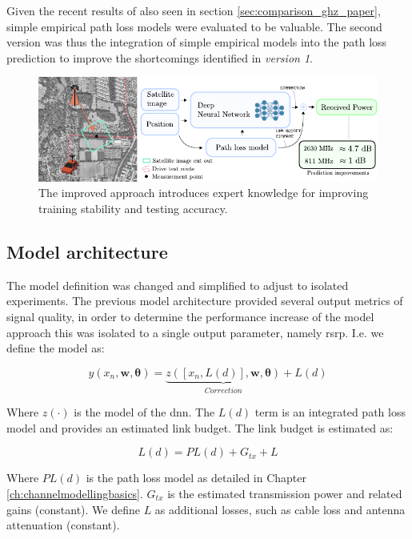 Given the recent results of \cite{Thrane2019ComparisonGHz} also seen in section \ref{sec:comparison_ghz_paper}, simple empirical path loss models were evaluated to be valuable. The second version was thus the integration of simple empirical models into the path loss prediction to improve the shortcomings identified in \emph{version 1}. 

\begin{figure}
    \centering
    \includegraphics{chapters/part_pathloss/model_aided_paper/version2_approach_figure.pdf}
    \caption{The improved approach introduces expert knowledge for improving training stability and testing accuracy.}
    \label{fig:my_label}
\end{figure}

\subsection{Model architecture}
The model definition was changed and simplified to adjust to isolated experiments. The previous model architecture provided several output metrics of signal quality, in order to determine the performance increase of the model approach this was isolated to a single output parameter, namely \gls{rsrp}. I.e. we define the model as:

\begin{equation}\label{eq:model}
    y(x_n, \mathbf{w}, \bm{\theta}) = \underbrace{z([x_n, L(d)], \mathbf{w}, \bm{\theta})}_{Correction} + L(d)
\end{equation}

Where $z(\cdot)$ is the model of the \gls{dnn}. The $L(d)$ term is an integrated path loss model and provides an estimated link budget. The link budget is estimated as:

\begin{equation}\label{eq:path_loss_model_linkbudget}
L(d) = PL(d) + G_{tx} + L
\end{equation}

Where $PL(d)$ is the  path loss model as detailed in Chapter \ref{ch:channelmodellingbasics}. $G_{tx}$ is the estimated transmission power and related gains (constant). We define $L$ as additional losses, such as cable loss and antenna attenuation (constant). 

